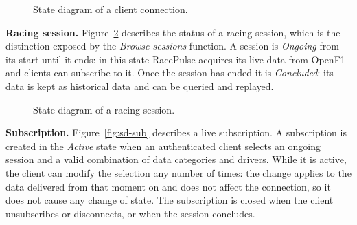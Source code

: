 \documentclass[11pt,a4paper]{article}
\newcommand{\RP}{RacePulse}
\begin{document}
\begin{figure}[H]
\centering
{}
\caption{State diagram of a client connection.}\label{fig:sd-conn}
\end{figure}

\textbf{Racing session.} Figure~\ref{fig:sd-session} describes the status of a racing session, which is the
distinction exposed by the \emph{Browse sessions} function. A session is \emph{Ongoing} from its start until it
ends: in this state \RP{} acquires its live data from OpenF1 and clients can subscribe to it. Once the session
has ended it is \emph{Concluded}: its data is kept as historical data and can be queried and replayed.

\begin{figure}[H]
\centering
{}
\caption{State diagram of a racing session.}\label{fig:sd-session}
\end{figure}

\textbf{Subscription.} Figure~\ref{fig:sd-sub} describes a live subscription. A subscription is created in the
\emph{Active} state when an authenticated client selects an ongoing session and a valid combination of data
categories and drivers. While it is active, the client can modify the selection any number of times: the change
applies to the data delivered from that moment on and does not affect the connection, so it does not cause any
change of state. The subscription is closed when the client unsubscribes or disconnects, or when the session
concludes.
\end{document}
